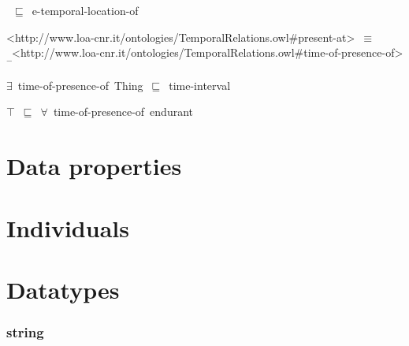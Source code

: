 \documentclass{article}
\begin{document}
~\ensuremath{\sqsubseteq}~e-temporal-location-of

<http://www.loa-cnr.it/ontologies/TemporalRelations.owl#present-at>~\ensuremath{\equiv}~<http://www.loa-cnr.it/ontologies/TemporalRelations.owl#time-of-presence-of>\ensuremath{^-}

\ensuremath{\exists}~time-of-presence-of~Thing~\ensuremath{\sqsubseteq}~time-interval

\ensuremath{\top}~\ensuremath{\sqsubseteq}~\ensuremath{\forall}~time-of-presence-of~endurant

\section*{Data properties}\section*{Individuals}\section*{Datatypes}\subsubsection*{string}
\end{document}

